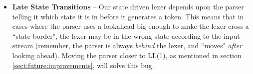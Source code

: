 \begin{itemize}
\item \textbf{Late State Transitions} -- Our state driven lexer depends upon
the parser telling it which state it is in before it generates a token. This means that in cases where the parser uses a lookahead big enough to make the lexer cross a ``state border", the lexer may be in the wrong state according to the input stream (remember, the parser is always \emph{behind} the lexer, and ``moves" \emph{after} looking ahead). Moving the parser closer to LL(1), as mentioned in section \ref{sect:future:improvements}, will solve this bug.

\end{itemize}

